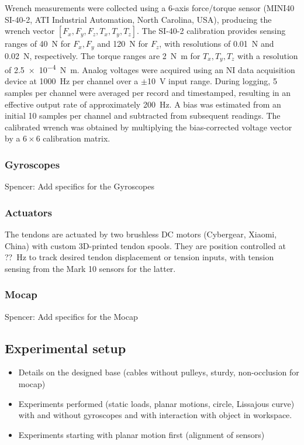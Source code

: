 \documentclass[14pt, a4paper]{article}
\begin{document}
Wrench measurements were collected using a 6-axis force/torque sensor 
(MINI40 SI-40-2, ATI Industrial Automation, North Carolina, USA), producing the wrench vector 
$[F_x, F_y, F_z, T_x, T_y, T_z]$. The SI-40-2 calibration provides sensing ranges of 
\SI{40}{\newton} for $F_x,F_y$ and \SI{120}{\newton} for $F_z$, with resolutions of 
\SI{0.01}{\newton} and \SI{0.02}{\newton}, respectively. The torque ranges are 
\SI{2}{\newton\meter} for $T_x,T_y,T_z$ with a resolution of \SI{2.5e-4}{\newton\meter}. 
Analog voltages were acquired using an NI data acquisition device at \SI{1000}{\hertz} per 
channel over a $\pm$\SI{10}{\volt} input range. During logging, \num{5} samples per channel 
were averaged per record and timestamped, resulting in an effective output rate of 
approximately \SI{200}{\hertz}. A bias was estimated from an initial \num{10} samples per 
channel and subtracted from subsequent readings. The calibrated wrench was obtained by 
multiplying the bias-corrected voltage vector by a $6\times6$ calibration matrix.

\subsubsection{Gyroscopes}
Spencer: Add specifics for the Gyroscopes

\subsubsection{Actuators}
The tendons are actuated by two brushless DC motors (Cybergear, Xiaomi, China) with custom 3D-printed tendon spools. They are position controlled at {\color{red}??}\SI{}{\hertz} to track desired tendon displacement or tension inputs, with tension sensing from the Mark 10 sensors for the latter.

\subsubsection{Mocap}
Spencer: Add specifics for the Mocap


\subsection{Experimental setup}
\begin{itemize}
    \item Details on the designed base (cables without pulleys, sturdy, non-occlusion for mocap)
    \item Experiments performed (static loads, planar motions, circle, Lissajous curve) with and without gyroscopes and with interaction with object in workspace.
    \item Experiments starting with planar motion first (alignment of sensors)
    
\end{itemize}
\end{document}
